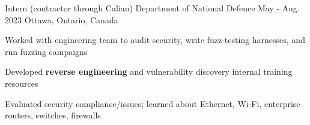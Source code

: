 

\begin{cventries}

  \cventry
    {Intern (contractor through Calian)} %
    {Department of National Defence} %
    {May - Aug. 2023} %
    {Ottawa, Ontario, Canada} %
    {
      \begin{cvitems} %
        \item{Worked with engineering team to audit security, write fuzz-testing harnesses, and run fuzzing campaigns}
        \item{Developed \textbf{reverse engineering} and vulnerability discovery internal training resources}
        \item{Evaluated security compliance/issues; learned about Ethernet, Wi-Fi, enterprise routers, switches, firewalls}
      \end{cvitems}
    }


\end{cventries}
